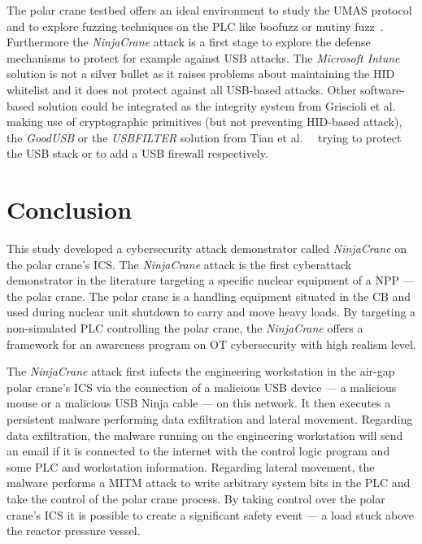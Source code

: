 The polar crane testbed offers an ideal environment to study the UMAS protocol and to explore fuzzing techniques on the PLC like boofuzz or mutiny fuzz~\cite{Gao21}. Furthermore the \emph{NinjaCrane} attack is a first stage to explore the defense mechanisms to protect for example against USB attacks. The \emph{Microsoft Intune}~\cite{intune-servie} solution is not a silver bullet as it raises problems about maintaining the HID whitelist and it does not protect against all USB-based attacks. Other software-based solution could be integrated as the integrity system from Griscioli et al.~\cite{Griscioli16} making use of cryptographic primitives (but not preventing HID-based attack), the \emph{GoodUSB} or the \emph{USBFILTER} solution from Tian et al.~\cite{Tian15}~\cite{tian16} trying to protect the USB stack or to add a USB firewall respectively. 

 

\section{Conclusion}

This study developed a cybersecurity attack demonstrator called \emph{NinjaCrane} on the polar crane's ICS. The \emph{NinjaCrane} attack is the first cyberattack demonstrator in the literature targeting a specific nuclear equipment of a NPP — the polar crane. The polar crane is a handling equipment situated in the CB and used during nuclear unit shutdown to carry and move heavy loads. By targeting a non-simulated PLC controlling the polar crane, the \emph{NinjaCrane} offers a framework for an awareness program on OT cybersecurity with high realism level.

The \emph{NinjaCrane} attack first infects the engineering workstation in the air-gap polar crane's ICS via the connection of a malicious USB device — a malicious mouse or a malicious USB Ninja cable — on this network. It then executes a persistent malware performing data exfiltration and lateral movement. Regarding data exfiltration, the malware running on the engineering workstation will send an email if it is connected to the internet with the control logic program and some PLC and workstation information. Regarding lateral movement, the malware performs a MITM attack to write arbitrary system bits in the PLC and take the control of the polar crane process. By taking control over the polar crane's ICS it is possible to create a significant safety event — a load stuck above the reactor pressure vessel.

